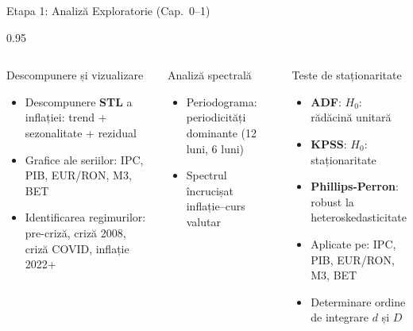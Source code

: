 \documentclass[9pt, aspectratio=169, t]{beamer}
\begin{document}
\begin{frame}{Etapa 1: Analiză Exploratorie (Cap.\ 0--1)}
    \begin{cminipage}{0.95\textwidth}
        {\footnotesize
        \begin{columns}[T]
            \begin{block}{Descompunere și vizualizare}
                \begin{itemize}\setlength{\itemsep}{0pt}
                    \item Descompunere \textbf{STL} a inflației: trend + sezonalitate + rezidual
                    \item Grafice ale seriilor: IPC, PIB, EUR/RON, M3, BET
                    \item Identificarea regimurilor: pre-criză, criză 2008, criză COVID, inflație 2022+
                \end{itemize}
            \end{block}

            \vspace{0.15cm}

            \begin{exampleblock}{Analiză spectrală}
                \begin{itemize}\setlength{\itemsep}{0pt}
                    \item Periodograma: periodicități dominante (12 luni, 6 luni)
                    \item Spectrul încrucișat inflație--curs valutar
                \end{itemize}
            \end{exampleblock}

            \begin{alertblock}{Teste de staționaritate}
                \begin{itemize}\setlength{\itemsep}{0pt}
                    \item \textbf{ADF}: $H_0$: rădăcină unitară
                    \item \textbf{KPSS}: $H_0$: staționaritate
                    \item \textbf{Phillips-Perron}: robust la heteroskedasticitate
                    \item Aplicate pe: IPC, PIB, EUR/RON, M3, BET
                    \item Determinare ordine de integrare $d$ și $D$
                \end{itemize}
            \end{alertblock}


\end{columns}}
\end{cminipage}
\end{frame}
\end{document}
